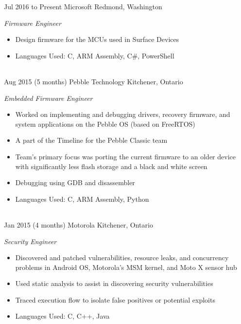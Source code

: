 \documentclass[print]{friggeri-cv} %
\begin{document}
\begin{entrylist}


\entry
{Jul 2016}
{to Present}
{Microsoft}
{Redmond, Washington}
{\emph{Firmware Engineer}
\begin{itemize}
\item Design firmware for the MCUs used in Surface Devices
\item Languages Used: C, ARM Assembly, C\#, PowerShell
\end{itemize}
}\\


\entry
{Aug 2015}
{(5 months)}
{Pebble Technology}
{Kitchener, Ontario}
{\emph{Embedded Firmware Engineer}
\begin{itemize}
\item Worked on implementing and debugging drivers, recovery firmware, and system applications on the Pebble OS (based on FreeRTOS)
\item A part of the Timeline for the Pebble Classic team
\item Team's primary focus was porting the current firmware to an older device with significantly less flash storage and a black and white screen
\item Debugging using GDB and disassembler
\item Languages Used: C, ARM Assembly, Python
\end{itemize}
}\\

\entry
{Jan 2015}
{(4 months)}
{Motorola}
{Kitchener, Ontario}
{\emph{Security Engineer}
\begin{itemize}
\item Discovered and patched vulnerabilities, resource leaks, and concurrency problems in Android OS, Motorola's MSM kernel, and Moto X sensor hub
\item Used static analysis to assist in discovering security vulnerabilities
\item Traced execution flow to isolate false positives or potential exploits
\item Languages Used: C, C++, Java
\end{itemize}
}\\


\end{entrylist}
\end{document}
